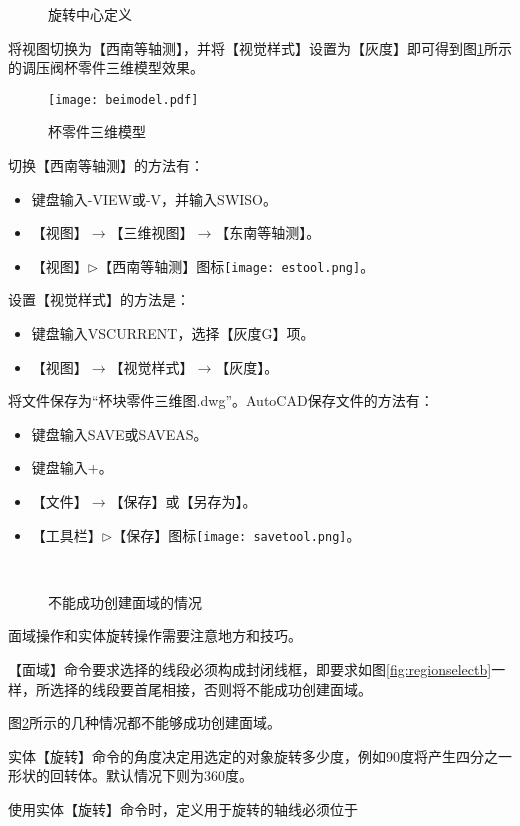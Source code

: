 \begin{procedure}
\begin{figure}[htbp]
\centering
{}\hspace{30pt}
\caption{旋转中心定义}
\end{figure}
\item 将视图切换为【西南等轴测】，并将【视觉样式】设置为【灰度】即可得到图\ref{fig:beimodel}所示的调压阀杯零件三维模型效果。
\begin{figure}
\centering
\texttt{[image: beimodel.pdf]}
\caption{杯零件三维模型}\label{fig:beimodel}
\end{figure}
切换【西南等轴测】的方法有：
\begin{itemize}
\item 键盘输入-VIEW或-V，并输入SWISO。
\item 【视图】$\rightarrow$【三维视图】$\rightarrow$【东南等轴测】。
\item 【视图】$\triangleright$【西南等轴测】图标\texttt{[image: estool.png]}。
\end{itemize}
设置【视觉样式】的方法是：
\begin{itemize}
\item  键盘输入VSCURRENT，选择【灰度G】项。
\item 【视图】$\rightarrow$【视觉样式】$\rightarrow$【灰度】。
\end{itemize}
\item 将文件保存为“杯块零件三维图.dwg”。AutoCAD保存文件的方法有：
\begin{itemize}
\item 键盘输入SAVE或SAVEAS。
\item 键盘输入+。
\item 【文件】$\rightarrow$【保存】或【另存为】。
\item 【工具栏】$\triangleright$【保存】图标\texttt{[image: savetool.png]}。
\end{itemize}
\end{procedure}
\begin{figure}[htbp]
\centering
{}\hspace{20pt}
\\
\hspace{20pt}
\caption{不能成功创建面域的情况}\label{fig:buchengong}
\end{figure}

面域操作和实体旋转操作需要注意地方和技巧。
\begin{tips}
\item 【面域】命令要求选择的线段必须构成封闭线框，即要求如图\ref{fig:regionselectb}一样，所选择的线段要首尾相接，否则将不能成功创建面域。
\item 图\ref{fig:buchengong}所示的几种情况都不能够成功创建面域。

\item 实体【旋转】命令的角度决定用选定的对象旋转多少度，例如90度将产生四分之一形状的回转体。默认情况下则为360度。
\item 使用实体【旋转】命令时，定义用于旋转的轴线必须位于
\end{tips}
\endinput